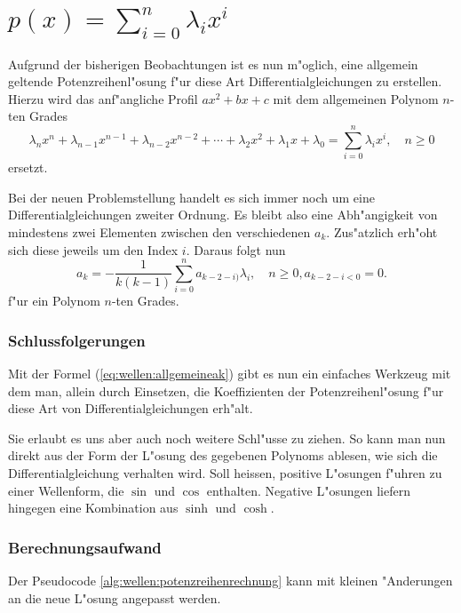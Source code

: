 \section{\texorpdfstring{$p(x) = \sum_{i=0}^{n}\lambda_ix^i$}{p(x) = summe i = 
0 bis n lambdai xi}}

Aufgrund der bisherigen Beobachtungen ist es nun m"oglich, eine 
allgemein geltende Potenzreihenl"osung f"ur diese Art Differentialgleichungen 
zu erstellen. Hierzu wird das anf"angliche Profil $ax^2 + bx + c$ mit dem 
allgemeinen Polynom $n$-ten Grades
\begin{equation*}
	\lambda_nx^n + \lambda_{n-1}x^{n-1} + \lambda_{n-2}x^{n-2} + \dotsb + 
	\lambda_2x^2 + \lambda_1x + \lambda_0 = \sum_{i=0}^{n}\lambda_ix^i, \quad n 
	\ge 0
\end{equation*}
ersetzt.

Bei der neuen Problemstellung handelt es sich immer noch um eine 
Differentialgleichungen zweiter Ordnung. Es bleibt also eine Abh"angigkeit von 
mindestens zwei Elementen zwischen den verschiedenen $a_k$. Zus"atzlich erh"oht 
sich diese jeweils um den Index $i$. Daraus folgt nun
\begin{equation}
	a_k = -\frac{1}{k(k-1)}\sum_{i=0}^{n}a_{k-2-i)}\lambda_i, \quad n \ge 0, 
	a_{k-2-i < 0} =  0.
	\label{eq:wellen:allgemeineak}
\end{equation}
f"ur ein Polynom $n$-ten Grades.

\subsubsection{Schlussfolgerungen}

Mit der Formel (\ref{eq:wellen:allgemeineak}) gibt es nun ein einfaches 
Werkzeug mit dem man, allein durch Einsetzen, die Koeffizienten der 
Potenzreihenl"osung f"ur diese Art von Differentialgleichungen erh"alt.

Sie erlaubt es uns aber auch noch weitere Schl"usse zu ziehen. So kann man 
nun direkt aus der Form der L"osung des gegebenen Polynoms ablesen, wie sich 
die Differentialgleichung verhalten wird. Soll heissen, positive L"osungen 
f"uhren zu einer Wellenform, die $\sin$ und $\cos$ enthalten. Negative 
L"osungen liefern hingegen eine Kombination aus $\sinh$ und $\cosh$.

\subsubsection{Berechnungsaufwand}
Der Pseudocode \ref{alg:wellen:potenzreihenrechnung} kann mit kleinen 
"Anderungen an die neue L"osung angepasst werden. 







